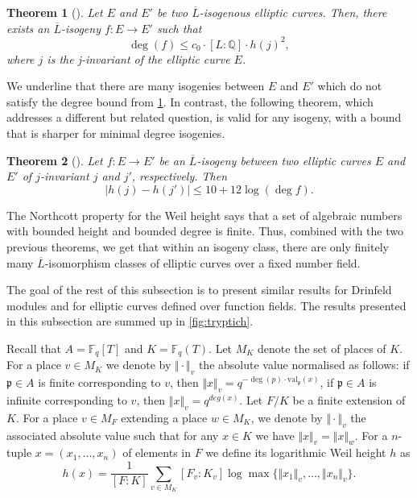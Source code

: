 \documentclass[11pt]{article}
\newtheorem{theorem}{Theorem}[section]
\theoremstyle{definition}
\renewcommand\leq{\leqslant}
\newcommand\Q{\mathbb{Q}}
\newcommand\Fq{\mathbb{F}_q}
\begin{document}
\begin{theorem}[\cite{GR14}]\label{minimal isog}
    Let $E $ and $E'$ be two $\overline{L}$-isogenous elliptic curves. Then, there exists an  $\overline{L}$-isogeny $f : E \rightarrow E'$ such that
    \[\deg(f)\leq c_0\cdot [L:\Q]\cdot h(j)^2,\]
    where $j$ is the j-invariant of the elliptic curve $E$.
\end{theorem}

We underline that
there are many isogenies between $E$ and $E'$ which do not satisfy the degree bound from \cref{minimal isog}. In contrast, the following theorem, which addresses a different but related question, is valid for any isogeny, with a bound that is sharper for minimal degree isogenies.

\begin{theorem}[]\label{ECNF}
    Let $f : E \rightarrow E'$ be an $\overline{L}$-isogeny between two elliptic curves $E$ and $E'$ of $j$-invariant $j$ and $j'$, respectively. Then
    \[|h(j)-h(j')|\leq 10+12\log(\deg f).\]
\end{theorem}

The Northcott property for the Weil height says that a set of algebraic numbers with bounded height and bounded degree is finite. Thus, combined with the two previous theorems, we get that within an isogeny class, there are only finitely many $\overline{L}$-isomorphism classes of elliptic curves over a fixed number field.

The goal of the rest of this subsection is to present similar results for Drinfeld modules and for elliptic curves defined over function fields.  The results presented in this subsection are summed up in \cref{fig:tryptich}. 

Recall that $A=\Fq[T]$ and $K=\Fq(T)$. Let $M_K$ denote the set of places of $K$.
For a place $v\in M_K$ we denote by $\Vert \cdot \Vert_v$ the absolute value normalised as follows: if $\mathfrak{p}\in A$ is finite corresponding to $v$, then $\Vert x \Vert_v=q^{-\deg(p)\cdot \mathrm{val}_\mathfrak{p}(x)}$, if $\mathfrak{p}\in A$ is infinite corresponding to $v$, then $\Vert x \Vert_v=q^{deg(x)}$.
Let $F/K$ be a finite extension of $K$. For a place $v\in M_F$ extending a place $w\in{M_K}$, we denote by $\Vert \cdot \Vert_v$ the associated absolute value such that for any $x\in K$ we have $\Vert x \Vert_v=\Vert x \Vert_w$. For a $n$-tuple $x=(x_1,\dots,x_n)$ of elements in $F$ we define its logarithmic Weil height $h$ as
\begin{equation}\label{Weil height}
h(x)=\frac{1}{[F:K]}\sum_{v\in M_K} [F_v:K_v]\log\max\{\Vert x_1 \Vert_v,\dots,\Vert x_n \Vert_v\}.
\end{equation}
\end{document}
